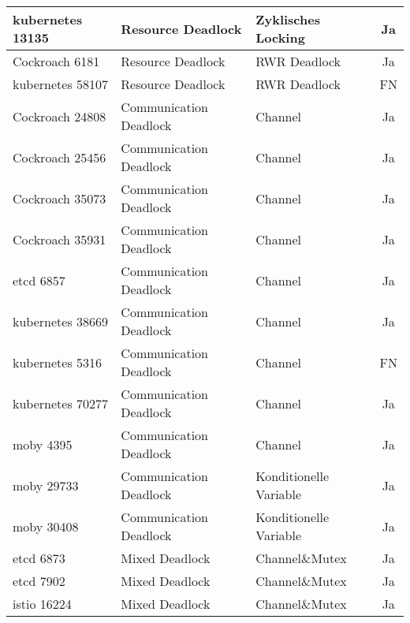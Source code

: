 \begin{longtable}[c]{|l|l|l|c|}
  kubernetes 13135      & Resource Deadlock      & Zyklisches Locking     & Ja                                   \\ \hline
  Cockroach 6181      & Resource Deadlock      & RWR Deadlock           & Ja                                   \\ \hline
  kubernetes 58107      & Resource Deadlock      & RWR Deadlock           & FN                                 \\ \hline
  Cockroach 24808      & Communication Deadlock & Channel                & Ja                                   \\ \hline
  Cockroach 25456      & Communication Deadlock & Channel                & Ja                                   \\ \hline
  Cockroach 35073      & Communication Deadlock & Channel                & Ja                                   \\ \hline
  Cockroach 35931      & Communication Deadlock & Channel                & Ja                                   \\ \hline
  etcd 6857      & Communication Deadlock & Channel                & Ja                                   \\ \hline
  kubernetes 38669      & Communication Deadlock & Channel                & Ja                                   \\ \hline
  kubernetes 5316      & Communication Deadlock & Channel                & FN                                 \\ \hline
  kubernetes 70277      & Communication Deadlock & Channel                & Ja                                   \\ \hline
  moby 4395      & Communication Deadlock & Channel                & Ja                                   \\ \hline
  moby 29733      & Communication Deadlock & Konditionelle Variable & Ja                                   \\ \hline
  moby 30408      & Communication Deadlock & Konditionelle Variable & Ja                                   \\ \hline
  etcd 6873      & Mixed Deadlock         & Channel\&Mutex         & Ja                                   \\ \hline
  etcd 7902      & Mixed Deadlock         & Channel\&Mutex         & Ja                                   \\ \hline
  istio 16224      & Mixed Deadlock         & Channel\&Mutex         & Ja                                   \\ \hline

\end{longtable}
